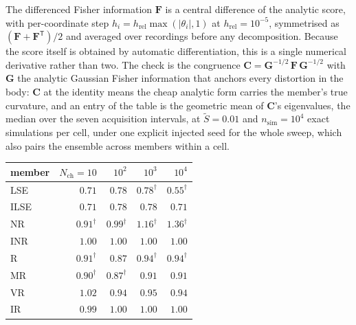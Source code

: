 \documentclass[11pt]{article}
\begin{document}
The differenced Fisher information $\mathbf{F}$ is a central difference of the analytic score,
with per-coordinate step $h_i = h_{\mathrm{rel}}\max(|\theta_i|,1)$ at
$h_{\mathrm{rel}} = 10^{-5}$, symmetrised as $(\mathbf{F} + \mathbf{F}^{\mathsf T})/2$ and
averaged over recordings before any decomposition. Because the score itself is obtained by
automatic differentiation, this is a single numerical derivative rather than two. The check is
the congruence $\mathbf{C} = \mathbf{G}^{-1/2}\,\mathbf{F}\,\mathbf{G}^{-1/2}$ with
$\mathbf{G}$ the analytic Gaussian Fisher information that anchors every distortion in the body:
$\mathbf{C}$ at the identity means the cheap analytic form carries the member's true curvature,
and an entry of the table is the geometric mean of $\mathbf{C}$'s eigenvalues, the median over
the seven acquisition intervals, at $\widetilde{S}=0.01$ and $n_{\mathrm{sim}}=10^{4}$ exact
simulations per cell, under one explicit injected seed for the whole sweep, which also pairs the
ensemble across members within a cell.

\begin{center}
\begin{tabular}{lrrrr}
\hline
member & $N_{\mathrm{ch}}=10$ & $10^{2}$ & $10^{3}$ & $10^{4}$ \\
\hline
LSE  & $0.71$ & $0.78$ & $0.78^{\dagger}$ & $0.55^{\dagger}$ \\
ILSE & $0.71$ & $0.78$ & $0.78$ & $0.71$ \\
NR   & $0.91^{\dagger}$ & $0.99^{\dagger}$ & $1.16^{\dagger}$ & $1.36^{\dagger}$ \\
INR  & $1.00$ & $1.00$ & $1.00$ & $1.00$ \\
R    & $0.91^{\dagger}$ & $0.87$ & $0.94^{\dagger}$ & $0.94^{\dagger}$ \\
MR   & $0.90^{\dagger}$ & $0.87^{\dagger}$ & $0.91$ & $0.91$ \\
VR   & $1.02$ & $0.94$ & $0.95$ & $0.94$ \\
IR   & $0.99$ & $1.00$ & $1.00$ & $1.00$ \\
\hline
\end{tabular}
\end{center}
\end{document}
